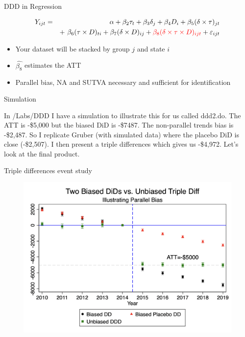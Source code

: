 \documentclass{beamer}
\begin{document}
\begin{frame}{DDD in Regression}
	
	\begin{eqnarray*}
	Y_{ijt} &=&\alpha +  \beta_2 \tau_t + \beta_3 \delta_j  + \beta_4 D_i + \beta_5(\delta \times \tau)_{jt} \\
	&& +\ \beta_6(\tau \times D)_{ti} +  \beta_7(\delta \times D)_{ij} +  \textcolor{red}{\beta_8(\delta \times \tau \times  D)_{ijt}}+  \varepsilon_{ijt}
	\end{eqnarray*}
	
	\begin{itemize}
	\item Your dataset will be stacked by group $j$ and state $i$
	\item $\widehat{\beta_8}$ estimates the ATT
	\item Parallel bias, NA and SUTVA necessary and sufficient for identification
	\end{itemize}
	
\end{frame}



\begin{frame}{Simulation}

In /Labs/DDD I have a simulation to illustrate this for us called ddd2.do.  The ATT is -\$5,000 but the biased DiD is -\$7487.  The non-parallel trends bias is -\$2,487.  So I replicate Gruber (with simulated data) where the placebo DiD is close (-\$2,507).  I then present a triple differences which gives us -\$4,972. Let's look at the final product.

\end{frame}

\begin{frame}{Triple differences event study}

\begin{figure}
\includegraphics[scale=0.25]{./lecture_includes/ddd_simulation}
\end{figure}



\end{frame}  
\end{document}
